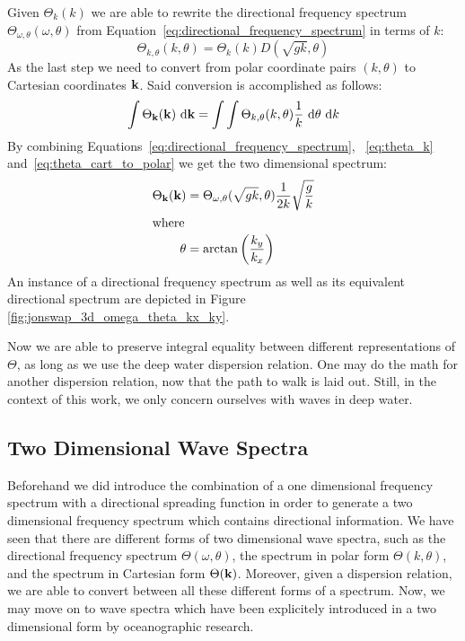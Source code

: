 Given $\Theta_k(k)$ we are able to rewrite the directional frequency spectrum
$\Theta_{\omega, \theta}(\omega, \theta)$ from
Equation~\ref{eq:directional_frequency_spectrum} in terms of \wavenumber $k$:
%
\begin{equation}
\label{eq:theta_k_polar}
 \Theta_{k,\theta}(k,\theta) = \Theta_k(k)D(\sqrt{gk},\theta)
\end{equation}
%
As the last step we need to convert from polar coordinate pairs 
$(k,\theta)$ to Cartesian \wavenumber coordinates $\mathbf{k}$. Said conversion 
is accomplished as follows:
%
\begin{equation}
\label{eq:theta_cart_to_polar}
\int\Theta_{\mathbf{k}}(\mathbf{k})~\mathrm{d}\mathbf{k} = 
\int\int\Theta_{k,\theta}(k,\theta)\frac{1}{k}~\mathrm{d}\theta~\mathrm{d}k
\end{equation}
%
By combining Equations~\ref{eq:directional_frequency_spectrum}, 
~\ref{eq:theta_k} and~\ref{eq:theta_cart_to_polar} we get the two dimensional
\wavenumber spectrum:
%
\begin{align}
\Theta_{\mathbf{k}}(\mathbf{k}) &= \Theta_{\omega,\theta}(\sqrt{gk}, 
\theta)\frac{1}{2k}\sqrt{\frac{g}{k}}\\
\intertext{where}
\theta &= \arctan\left(\frac{k_y}{k_x}\right)
\end{align}
%
An instance of a directional frequency spectrum as well as its equivalent
directional \wavenumber spectrum are depicted in Figure
\ref{fig:jonswap_3d_omega_theta_kx_ky}.

Now we are able to preserve integral equality between different representations 
of $\Theta$, as long as we use the deep water dispersion relation. One may do 
the math for another dispersion relation, now that the path to walk is laid 
out. Still, in the context of this work, we only concern ourselves with waves 
in deep water.
%
\subsection{Two Dimensional Wave Spectra}
%
Beforehand we did introduce the combination of a one dimensional 
frequency spectrum with a directional spreading function in order to generate a 
two dimensional frequency spectrum which contains directional information. We 
have seen that there are different forms of two dimensional wave spectra, 
such as the directional frequency spectrum $\Theta(\omega, \theta)$, the 
\wavenumber spectrum in polar form $\Theta(k, \theta)$, and the
\wavenumber spectrum in Cartesian form $\Theta(\mathbf{k})$. Moreover, given a
dispersion relation, we 
are able to convert between all these different forms of a spectrum. Now, we 
may move on to wave spectra which have been explicitely introduced in a two 
dimensional form by oceanographic research.

